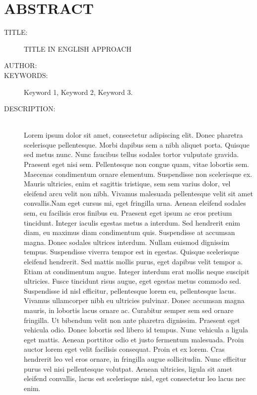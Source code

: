 
\chapter*{ABSTRACT}

\footnotesize{
\begin{description}
  \item[TITLE:] TITLE IN ENGLISH APPROACH
  \item[AUTHOR:] \MakeUppercase{\autor} 
  \item[KEYWORDS:] Keyword 1, Keyword 2, Keyword 3.
  \item[DESCRIPTION:]\hfill \\ Lorem ipsum dolor sit amet, consectetur adipiscing elit. Donec pharetra scelerisque pellentesque. Morbi dapibus sem a nibh aliquet porta. Quisque sed metus nunc. Nunc faucibus tellus sodales tortor vulputate gravida. Praesent eget nisi sem. Pellentesque non congue quam, vitae lobortis sem. Maecenas condimentum ornare elementum. Suspendisse non scelerisque ex. Mauris ultricies, enim et sagittis tristique, sem sem varius dolor, vel eleifend arcu velit non nibh. Vivamus malesuada pellentesque velit sit amet convallis.Nam eget cursus mi, eget fringilla urna. Aenean eleifend sodales sem, eu facilisis eros finibus eu. Praesent eget ipsum ac eros pretium tincidunt. Integer iaculis egestas metus a interdum. Sed hendrerit enim diam, eu maximus diam condimentum quis. Suspendisse at accumsan magna. Donec sodales ultrices interdum. Nullam euismod dignissim tempus. Suspendisse viverra tempor est in egestas. Quisque scelerisque eleifend hendrerit. Sed mattis mollis purus, eget dapibus velit tempor a. Etiam at condimentum augue. Integer interdum erat mollis neque suscipit ultricies. Fusce tincidunt risus augue, eget egestas metus commodo sed. Suspendisse id nisl efficitur, pellentesque lorem eu, pellentesque lacus. Vivamus ullamcorper nibh eu ultricies pulvinar. Donec accumsan magna mauris, in lobortis lacus ornare ac. Curabitur semper sem sed ornare fringilla. Ut bibendum velit non ante pharetra dignissim. Praesent eget vehicula odio. Donec lobortis sed libero id tempus. Nunc vehicula a ligula eget mattis. Aenean porttitor odio et justo fermentum malesuada. Proin auctor lorem eget velit facilisis consequat. Proin et ex lorem. Cras hendrerit leo vel eros ornare, in fringilla augue sollicitudin. Nunc efficitur purus vel nisi pellentesque volutpat. Aenean ultricies, ligula sit amet eleifend convallis, lacus est scelerisque nisl, eget consectetur leo lacus nec enim.
\end{description}}\normalsize
